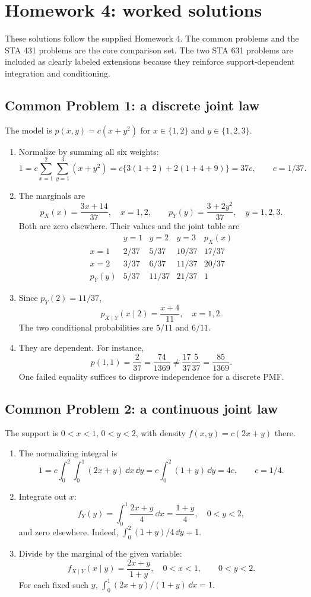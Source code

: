 \section{Homework 4: worked solutions}
\label{sec:hw4}
These solutions follow the supplied Homework 4. The common problems and the STA 431 problems are the core comparison set. The two STA 631 problems are included as clearly labeled extensions because they reinforce support-dependent integration and conditioning.

\subsection*{Common Problem 1: a discrete joint law}
The model is $p(x,y)=c(x+y^2)$ for $x\in\{1,2\}$ and $y\in\{1,2,3\}$.
\begin{enumerate}[label=(\alph*),leftmargin=*]
\item Normalize by summing all six weights:
\[
1=c\sum_{x=1}^2\sum_{y=1}^3(x+y^2)
=c\{3(1+2)+2(1+4+9)\}=37c,
\qquad \boxed{c=1/37}.
\]
\item The marginals are
\[
 p_X(x)=\frac{3x+14}{37},\quad x=1,2,
 \qquad
 p_Y(y)=\frac{3+2y^2}{37},\quad y=1,2,3.
\]
Both are zero elsewhere. Their values and the joint table are
\[
\begin{array}{c|ccc|c}
 &y=1&y=2&y=3&p_X(x)\\\hline
x=1&2/37&5/37&10/37&17/37\\
x=2&3/37&6/37&11/37&20/37\\\hline
p_Y(y)&5/37&11/37&21/37&1
\end{array}
\]
\item Since $p_Y(2)=11/37$,
\[
 \boxed{p_{X\mid Y}(x\mid2)=\frac{x+4}{11},\quad x=1,2.}
\]
The two conditional probabilities are $5/11$ and $6/11$.
\item They are dependent. For instance,
\[
 p(1,1)=\frac2{37}=\frac{74}{1369}
 \ne \frac{17}{37}\frac5{37}=\frac{85}{1369}.
\]
One failed equality suffices to disprove independence for a discrete PMF.
\end{enumerate}

\subsection*{Common Problem 2: a continuous joint law}
The support is $0<x<1$, $0<y<2$, with density $f(x,y)=c(2x+y)$ there.
\begin{enumerate}[label=(\alph*),leftmargin=*]
\item The normalizing integral is
\[
 1=c\int_0^2\int_0^1(2x+y)\,\dd x\,\dd y
 =c\int_0^2(1+y)\,\dd y=4c,
 \qquad\boxed{c=1/4}.
\]
\item Integrate out $x$:
\[
 \boxed{f_Y(y)=\int_0^1\frac{2x+y}{4}\,\dd x
 =\frac{1+y}{4},\quad0<y<2,}
\]
and zero elsewhere. Indeed, $\int_0^2(1+y)/4\,\dd y=1$.
\item Divide by the marginal of the given variable:
\[
 \boxed{f_{X\mid Y}(x\mid y)=\frac{2x+y}{1+y},\quad0<x<1,}
 \qquad0<y<2.
\]
For each fixed such $y$, $\int_0^1(2x+y)/(1+y)\,\dd x=1$.
\end{enumerate}

